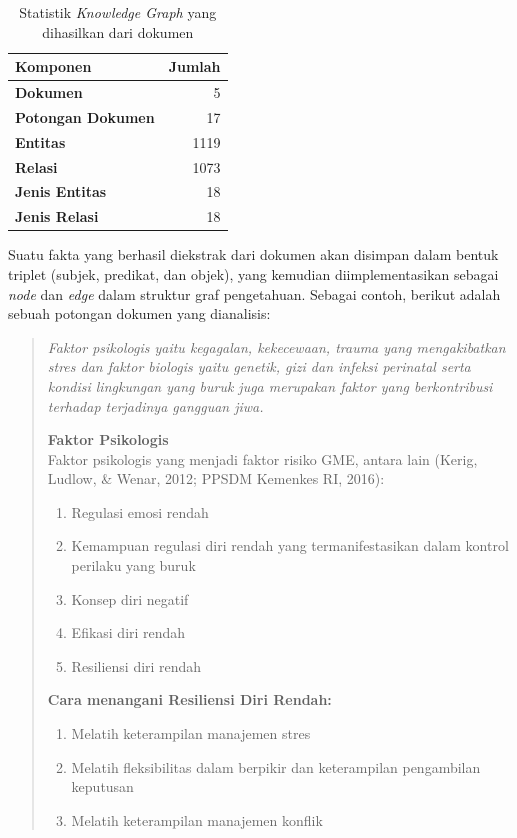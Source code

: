 \begin{table}[h]
	\centering
	\caption{Statistik \textit{Knowledge Graph} yang dihasilkan dari dokumen}
	\label{tab:knowledge-graph-stats}
	{\setlength{\tabcolsep}{0.5em}
		\begin{tabular}{|l|r|}
			\hline
			\textbf{Komponen}         & \textbf{Jumlah} \\
			\hline \hline
			\textbf{Dokumen}          &
			5                                           \\
			\hline
			\textbf{Potongan Dokumen} &
			17                                          \\
			\hline
			\textbf{Entitas}          &
			1119                                        \\
			\hline
			\textbf{Relasi}           &
			1073                                        \\
			\hline
			\textbf{Jenis Entitas}    &
			18                                          \\
			\hline
			\textbf{Jenis Relasi}     &
			18                                          \\
			\hline
		\end{tabular}}
\end{table}


Suatu fakta yang berhasil diekstrak dari dokumen akan disimpan dalam bentuk triplet (subjek, predikat, dan objek), yang kemudian diimplementasikan sebagai \textit{node} dan \textit{edge} dalam struktur graf pengetahuan.
Sebagai contoh, berikut adalah sebuah potongan dokumen yang dianalisis:

\begin{quote}
	\itshape
	Faktor psikologis yaitu kegagalan, kekecewaan, trauma yang mengakibatkan stres dan faktor biologis yaitu genetik, gizi dan infeksi perinatal serta kondisi lingkungan yang buruk juga merupakan faktor yang berkontribusi terhadap terjadinya gangguan jiwa.

	\textbf{Faktor Psikologis} \\
	Faktor psikologis yang menjadi faktor risiko GME, antara lain (Kerig, Ludlow, \& Wenar, 2012; PPSDM Kemenkes RI, 2016):
	\begin{enumerate}
		\item Regulasi emosi rendah
		\item Kemampuan regulasi diri rendah yang termanifestasikan dalam kontrol perilaku yang buruk
		\item Konsep diri negatif
		\item Efikasi diri rendah
		\item Resiliensi diri rendah
	\end{enumerate}

	\textbf{Cara menangani Resiliensi Diri Rendah:}
	\begin{enumerate}[label=\alph*)]
		\item Melatih keterampilan manajemen stres
		\item Melatih fleksibilitas dalam berpikir dan keterampilan pengambilan keputusan
		\item Melatih keterampilan manajemen konflik
	\end{enumerate}
	\normalfont
\end{quote}

